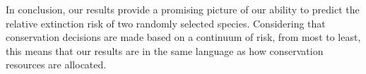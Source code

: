 \documentclass[12pt,letterpaper]{article}
\begin{document}
\begin{refsection}

In conclusion, our results provide a promising picture of our ability to predict the relative extinction risk of two randomly selected species. Considering that conservation decisions are made based on a continuum of risk, from most to least, this means that our results are in the same language as how conservation resources are allocated.


\printbibliography
\end{refsection}
\clearpage
\end{document}
